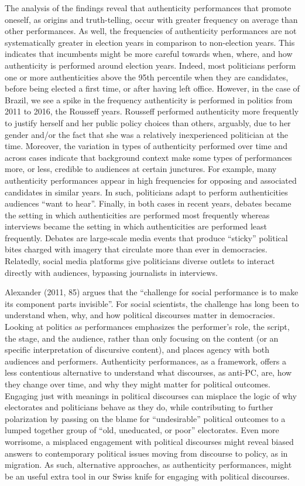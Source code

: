 \documentclass[smallextended]{svjour3}       %
\begin{document}
The analysis of the findings reveal that authenticity performances that
promote oneself, as origins and truth-telling, occur with greater
frequency on average than other performances. As well, the frequencies
of authenticity performances are not systematically greater in election
years in comparison to non-election years. This indicates that
incumbents might be more careful towards when, where, and how
authenticity is performed around election years. Indeed, most
politicians perform one or more authenticities above the 95th percentile
when they are candidates, before being elected a first time, or after
having left office. However, in the case of Brazil, we see a spike in
the frequency authenticity is performed in politics from 2011 to 2016,
the Rousseff years. Rousseff performed authenticity more frequently to
justify herself and her public policy choices than others, arguably, due
to her gender and/or the fact that she was a relatively inexperienced
politician at the time. Moreover, the variation in types of authenticity
performed over time and across cases indicate that background context
make some types of performances more, or less, credible to audiences at
certain junctures. For example, many authenticity performances appear in
high frequencies for opposing and associated candidates in similar
years. In such, politicians adapt to perform authenticities audiences
``want to hear''. Finally, in both cases in recent years, debates became
the setting in which authenticities are performed most frequently
whereas interviews became the setting in which authenticities are
performed least frequently. Debates are large-scale media events that
produce ``sticky'' political bites charged with imagery that circulate
more than ever in democracies. Relatedly, social media platforms give
politicians diverse outlets to interact directly with audiences,
bypassing journalists in interviews.

Alexander (2011, 85) argues that the ``challenge for social performance
is to make its component parts invisible''. For social scientists, the
challenge has long been to understand when, why, and how political
discourses matter in democracies. Looking at politics as performances
emphasizes the performer's role, the script, the stage, and the
audience, rather than only focusing on the content (or an specific
interpretation of discursive content), and places agency with both
audiences and performers. Authenticity performances, as a framework,
offers a less contentious alternative to understand what discourses, as
anti-PC, are, how they change over time, and why they might matter for
political outcomes. Engaging just with meanings in political discourses
can misplace the logic of why electorates and politicians behave as they
do, while contributing to further polarization by passing on the blame
for ``undesirable'' political outcomes to a lumped together group of
``old, uneducated, or poor'' electorates. Even more worrisome, a
misplaced engagement with political discourses might reveal biased
answers to contemporary political issues moving from discourse to
policy, as in migration. As such, alternative approaches, as
authenticity performances, might be an useful extra tool in our Swiss
knife for engaging with political discourses.
\end{document}
